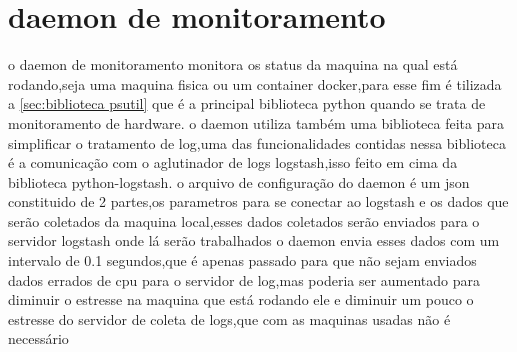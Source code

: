 \documentclass[
	12pt,				%
	openright,			%
	oneside,			%
	a4paper,			%
	english,			%
	french,				%
	spanish,			%
	brazil,				%
	]{abntex2}
\begin{document}
\section{daemon de monitoramento}
\label{sec:daemon de monitoramento}
o daemon de monitoramento monitora os status da maquina na qual está rodando,seja uma maquina fisica ou um container docker,para esse fim é tilizada a \autoref{sec:biblioteca psutil} que é a principal biblioteca python quando se trata de monitoramento de hardware.
o daemon utiliza também uma biblioteca feita para simplificar o tratamento de log,uma das funcionalidades contidas nessa biblioteca é a comunicação com o aglutinador de logs logstash,isso feito em cima da biblioteca python-logstash.
o arquivo de configuração do daemon é um json constituido de 2 partes,os parametros para se conectar ao logstash e os dados que serão coletados da maquina local,esses dados coletados serão enviados para o servidor logstash onde lá serão trabalhados
o daemon envia esses dados com um intervalo de 0.1 segundos,que é apenas passado para que não sejam enviados dados errados de cpu para o servidor de log,mas poderia ser aumentado para diminuir o estresse na maquina que está rodando ele e diminuir um pouco o estresse do servidor de coleta de logs,que com as maquinas usadas não é necessário
\end{document}
